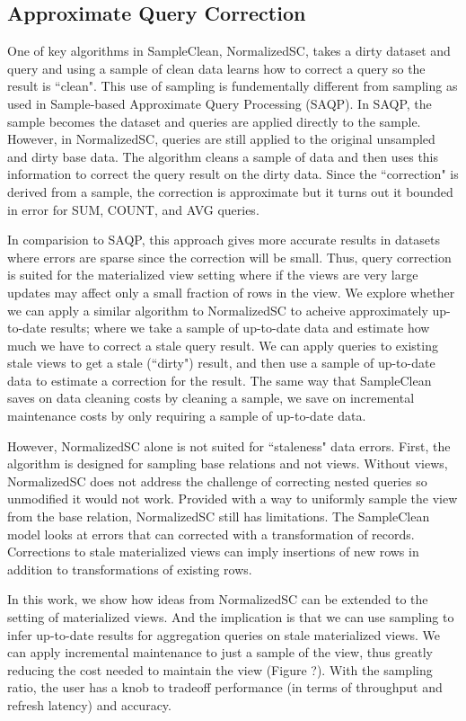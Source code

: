 \subsection{Approximate Query Correction}
One of key algorithms in SampleClean, NormalizedSC, takes a dirty dataset and query and using a sample of clean data learns how
to correct a query so the result is ``clean".
This use of sampling is fundementally different from sampling as used in Sample-based Approximate Query Processing (SAQP).
In SAQP, the sample becomes the dataset and queries are applied directly to the sample.
However, in NormalizedSC, queries are still applied to the original unsampled and dirty base data.
The algorithm cleans a sample of data and then uses this information to correct the query result on the dirty data.
Since the ``correction" is derived from a sample, the correction is approximate but it turns out it bounded in error for SUM, COUNT, and AVG queries.

In comparision to SAQP, this approach gives more accurate results in datasets where errors are sparse since the correction will be small.
Thus, query correction is suited for the materialized view setting where if the views are very large updates may affect only a small fraction of rows in the view.
We explore whether we can apply a similar algorithm to NormalizedSC to acheive approximately up-to-date results;
where we take a sample of up-to-date data and estimate how much we have to correct a stale query result.
We can apply queries to existing stale views to get a stale (``dirty") result, and then use a sample of up-to-date data to estimate a correction for the result.
The same way that SampleClean saves on data cleaning costs by cleaning a sample, we save on incremental maintenance costs by only requiring a sample of up-to-date data.

However, NormalizedSC alone is not suited for ``staleness" data errors.
First, the algorithm is designed for sampling base relations and not views.
Without views, NormalizedSC does not address the challenge of correcting nested queries so unmodified it would not work.
Provided with a way to uniformly sample the view from the base relation, NormalizedSC still has limitations. 
The SampleClean model looks at errors that can corrected with a transformation of records.
Corrections to stale materialized views can imply insertions of new rows in addition to transformations of existing rows.

In this work, we show how ideas from NormalizedSC can be extended to the setting of materialized views.
And the implication is that we can use sampling to infer up-to-date results for aggregation queries on stale materialized views. 
We can apply incremental maintenance to just a sample of the view, thus greatly reducing the cost needed to maintain the view (Figure ?). 
With the sampling ratio, the user has a knob to tradeoff performance (in terms of throughput and refresh latency) and accuracy.


